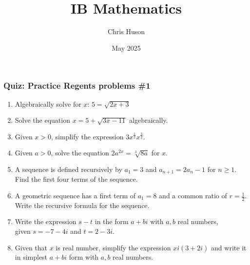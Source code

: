 \documentclass[12pt, twoside]{article}
\title{IB Mathematics}
\author{Chris Huson}
\date{May 2025}
\begin{document}
\subsubsection*{Quiz: Practice Regents problems \#1}

\begin{enumerate}
\item Algebraically solve for $x$: $5 = \sqrt{2x+3}$
\vspace{9cm}

\item Solve the equation $x = 5+\sqrt{3x-11}$ algebraically.

\newpage

\item Given $x > 0$, simplify the expression $\displaystyle 3x^{\frac{1}{2}}x^{\frac{3}{2}}$.
\vspace{9cm}

\item Given $a > 0$, solve the equation $2a^{2x} = \sqrt[3]{8a}$ for $x$.

\newpage
\item A sequence is defined recursively by \( a_1 = 3 \) and \( a_{n+1} = 2a_n - 1 \) for \( n \geq 1 \). Find the first four terms of the sequence.
\vspace{9cm}

\item A geometric sequence has a first term of \( a_1 = 8 \) and a common ratio of \( r = \frac{1}{2} \). Write the recursive formula for the sequence.


\newpage
\item Write the expression $s-t$ in the form $a+bi$ with $a,b$ real numbers, \\
given  $s = -7 - 4i $ and $t = 2 - 3i$.
\vspace{9cm}

\item Given that $x$ is real number, simplify the expression $xi(3+2i)$ and write it in simplest $a+bi$ form with $a,b$ real numbers.

\vspace{3cm}

\end{enumerate}
\end{document}
